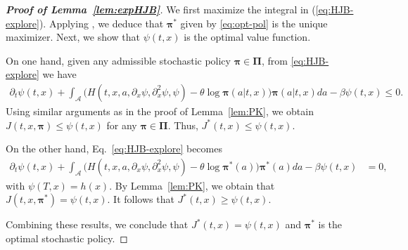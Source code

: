\documentclass[11pt]{article}
\newcommand{\1}{\mathbbm{1}}
\newcommand{\bpi}{\boldsymbol{\pi}}
\newcommand{\bPi}{\boldsymbol{\Pi}}
\begin{document}
\begin{proof}[\bf Proof of Lemma~\ref{lem:expHJB}]
We first maximize the integral in (\ref{eq:HJB-explore}). Applying \cite[Lemma 13]{jia2022q}, we deduce that  $\bpi^*$ given by \eqref{eq:opt-pol} is the unique maximizer. Next, we  show that $\psi(t,x)$ is the optimal value function.
	
On one hand, given any admissible stochastic policy $\bpi\in\bPi$, from \eqref{eq:HJB-explore} we have
\begin{align}
	\partial_t\psi(t, x) + \int_{\mathcal{A}} \big( H(t,x, a, \partial_x\psi,  \partial_{x}^2\psi, \psi)   - \theta \log \bpi(a|t,x)\big)\bpi(a|t,x)da - \beta\psi(t, x) \leq 0.
\end{align}
Using similar arguments as in the proof of Lemma~\ref{lem:PK}, we obtain $J(t, x, \boldsymbol{\pi}) \leq \psi(t,x)$ for any $\bpi\in\bPi$. Thus, $J^*(t, x) \leq \psi(t,x)$.

On the other hand, Eq.~\eqref{eq:HJB-explore} becomes
\begin{align} \label{eq:HJB2}
	\partial_t\psi(t, x) +   \int_{\mathcal{A}} \big( H(t,x, a, \partial_x\psi,  \partial_x^2\psi, \psi)  - \theta \log \boldsymbol{\pi}^*(a)\big) \boldsymbol{\pi}^*(a) da  - \beta  \psi(t, x) &= 0,
\end{align}
with $\psi (T, x) = h (x).$
By Lemma~\ref{lem:PK}, we obtain that $J(t, x, \boldsymbol{\pi}^*) = \psi(t,x)$. It follows that $J^*(t, x) \geq \psi(t,x)$.

Combining these results, we conclude that $J^*(t, x)=\psi(t,x)$ and $\bpi^*$ is the optimal stochastic policy.
\end{proof}
\end{document}
